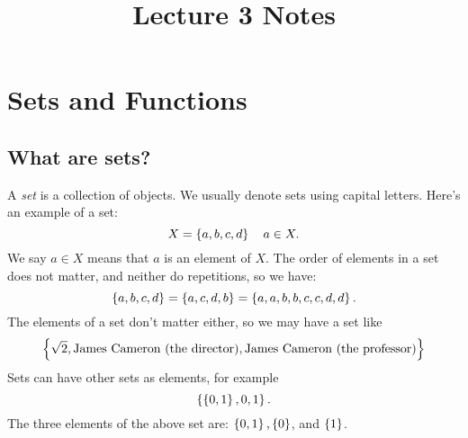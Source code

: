 \documentclass[class=article, crop=false]{standalone}
\title{Lecture 3 Notes}
\begin{document}
  \maketitle
  \newpage
  \noindent
  \section{Sets and Functions}
  \subsection{What are sets?}
   A \emph{set} is a collection of objects. We usually denote sets using capital letters. Here's an example of a set:
  \[
    X = \left\{a, b, c, d\right\} \quad a\in X.
  \]
  We say $a \in X$ means that $a$ is an element of $X$. The order of elements in a set does not matter, and neither do repetitions, so we have:
  \[
    \left\{a, b, c, d\right\} = \left\{a, c, d, b\right\} = \left\{a, a, b, b, c, c, d, d\right\}.
  \]
  The elements of a set don't matter either, so we may have a set like
  \[
    \left\{\sqrt{2}, \text{James Cameron (the director)}, \text{James Cameron (the professor)}\right\}
  \]
  Sets can have other sets as elements, for example
  \[
    \left\{\left\{0, 1\right\}, 0, 1\right\}.
  \]
  The three elements of the above set are: $\left\{0, 1\right\}, \left\{0\right\}$, and $\left\{1\right\}$.
\end{document}
